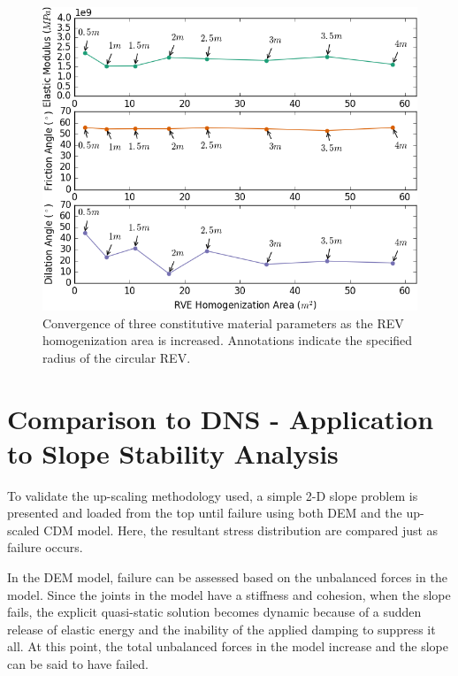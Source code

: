 \begin{figure}[!htb]
\begin{center}
\includegraphics[width=\textwidth]{figures/Chapter5/REVAnalysis}
\caption{{\label{fig:revconverge} Convergence of three constitutive material parameters as the REV homogenization area is increased. Annotations indicate the specified radius of the circular REV.%
}}
\end{center}
\end{figure}

\section{Comparison to DNS - Application to Slope Stability Analysis}

To validate the up-scaling methodology used, a simple 2-D slope problem is presented and loaded from the top until failure using both DEM and the up-scaled CDM model. Here, the resultant stress distribution are compared just as failure occurs. 

In the DEM model, failure can be assessed based on the unbalanced forces in the model. Since the joints in the model have a stiffness and cohesion, when the slope fails, the explicit quasi-static solution becomes dynamic because of a sudden release of elastic energy and the inability of the applied damping to suppress it all. At this point, the total unbalanced forces in the model increase and the slope can be said to have failed. 

